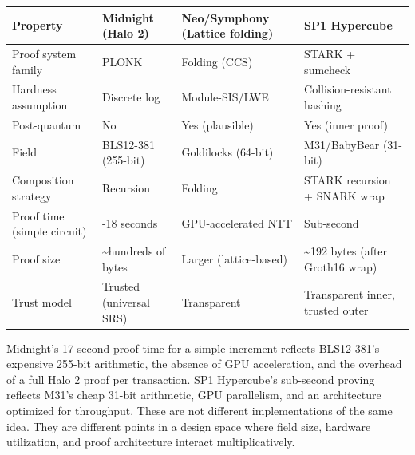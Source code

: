 \documentclass[
  11pt,
  openany]{report}
\begin{document}
\begin{longtable}[]{@{}
  >{\raggedright\arraybackslash}p{}
  >{\raggedright\arraybackslash}p{}
  >{\raggedright\arraybackslash}p{}
  >{\raggedright\arraybackslash}p{}@{}}
\toprule\noalign{}
\begin{minipage}[b]{\linewidth}\raggedright
Property
\end{minipage} & \begin{minipage}[b]{\linewidth}\raggedright
Midnight (Halo 2)
\end{minipage} & \begin{minipage}[b]{\linewidth}\raggedright
Neo/Symphony (Lattice folding)
\end{minipage} & \begin{minipage}[b]{\linewidth}\raggedright
SP1 Hypercube
\end{minipage} \\
\midrule\noalign{}
\arrayrulecolor{MidnightBlue}\midrule\arrayrulecolor{MidnightBorder}
\endhead
\bottomrule\noalign{}
\endlastfoot
Proof system family & PLONK & Folding (CCS) & STARK + sumcheck \\
Hardness assumption & Discrete log & Module-SIS/LWE & Collision-resistant
hashing \\
Post-quantum & No & Yes (plausible) & Yes (inner proof) \\
Field & BLS12-381 (255-bit) & Goldilocks (64-bit) & M31/BabyBear (31-bit) \\
Composition strategy & Recursion & Folding & STARK recursion + SNARK wrap \\
Proof time (simple circuit) & 17-18 seconds & GPU-accelerated NTT &
Sub-second \\
Proof size & \textasciitilde hundreds of bytes & Larger (lattice-based) &
\textasciitilde192 bytes (after Groth16 wrap) \\
Trust model & Trusted (universal SRS) & Transparent & Transparent inner, trusted
outer \\
\end{longtable}

Midnight's 17-second proof time for a simple increment reflects BLS12-381's
expensive 255-bit arithmetic, the absence of GPU acceleration, and the overhead
of a full Halo 2 proof per transaction. SP1 Hypercube's sub-second proving
reflects M31's cheap 31-bit arithmetic, GPU parallelism, and an architecture
optimized for throughput. These are not different implementations of the same
idea. They are different points in a design space where field size, hardware
utilization, and proof architecture interact multiplicatively.
\end{document}
